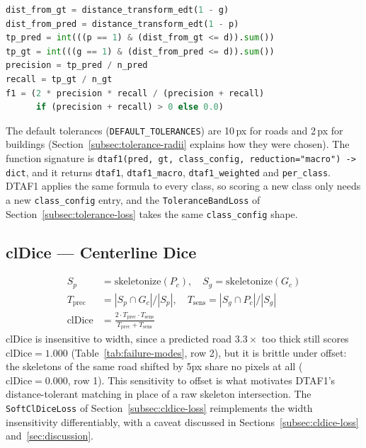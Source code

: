 \begin{lstlisting}[language=Python, caption={Tolerance-matching core, \texttt{metrics/dtaf1.py:53-64}}]
dist_from_gt = distance_transform_edt(1 - g)
dist_from_pred = distance_transform_edt(1 - p)
tp_pred = int(((p == 1) & (dist_from_gt <= d)).sum())
tp_gt = int(((g == 1) & (dist_from_pred <= d)).sum())
precision = tp_pred / n_pred
recall = tp_gt / n_gt
f1 = (2 * precision * recall / (precision + recall)
      if (precision + recall) > 0 else 0.0)
\end{lstlisting}

The default tolerances (\texttt{DEFAULT\_TOLERANCES}) are 10\,px for roads and 2\,px for buildings
(Section~\ref{subsec:tolerance-radii} explains how they were chosen). The function signature is
\texttt{dtaf1(pred, gt, class\_config, reduction="macro") -> dict}, and it returns \texttt{dtaf1},
\texttt{dtaf1\_macro}, \texttt{dtaf1\_weighted} and \texttt{per\_class}. DTAF1 applies the
same formula to every class, so scoring a new class only needs a new \texttt{class\_config} entry,
and the
\texttt{ToleranceBandLoss} of Section~\ref{subsec:tolerance-loss} takes the same
\texttt{class\_config} shape.

\subsection{clDice --- Centerline Dice}
\label{subsec:cldice}

\begin{align}
  S_p &= \mathrm{skeletonize}(P_c), \quad S_g = \mathrm{skeletonize}(G_c) \\
  T_{\mathrm{prec}} &= |S_p \cap G_c| / |S_p|, \quad T_{\mathrm{sens}} = |S_g \cap P_c| / |S_g| \\
  \mathrm{clDice} &= \frac{2 \cdot T_{\mathrm{prec}} \cdot T_{\mathrm{sens}}}
                          {T_{\mathrm{prec}} + T_{\mathrm{sens}}}
\end{align}
clDice is insensitive to width, since a predicted road $3.3\times$ too thick still scores
$\mathrm{clDice}=1.000$ (Table~\ref{tab:failure-modes}, row 2), but it is brittle under offset: the
skeletons of the same road shifted by 5px share no pixels at all ($\mathrm{clDice}=0.000$, row 1).
This sensitivity to offset is what motivates DTAF1's distance-tolerant matching in place of a raw
skeleton intersection. The \texttt{SoftClDiceLoss} of Section~\ref{subsec:cldice-loss}
reimplements the width insensitivity differentiably, with a caveat discussed in
Sections~\ref{subsec:cldice-loss} and~\ref{sec:discussion}.

